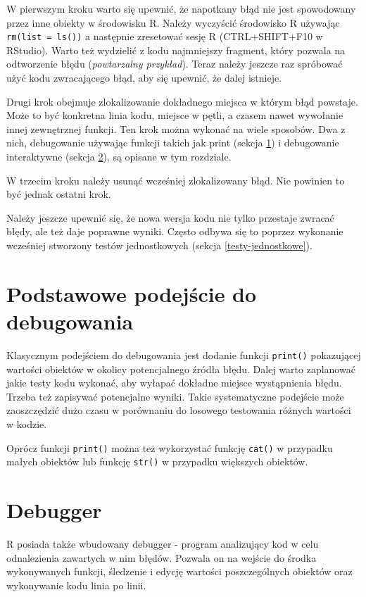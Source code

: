 \documentclass[paper=6in:9in,pagesize=pdftex,headinclude=on,footinclude=on,10pt]{scrbook}
\begin{document}
W pierwszym kroku warto się upewnić, że napotkany błąd nie jest spowodowany przez inne obiekty w środowisku R.
Należy wyczyścić środowisko R używając \texttt{rm(list\ =\ ls())} a następnie zresetować sesję R (CTRL+SHIFT+F10 w RStudio).
Warto też wydzielić z kodu najmniejszy fragment, który pozwala na odtworzenie błędu (\emph{powtarzalny przykład}).
Teraz należy jeszcze raz spróbować użyć kodu zwracającego błąd, aby się upewnić, że dalej istnieje.

Drugi krok obejmuje zlokalizowanie dokładnego miejsca w którym błąd powstaje.
Może to być konkretna linia kodu, miejsce w pętli, a czasem nawet wywołanie innej zewnętrznej funkcji.
Ten krok można wykonać na wiele sposobów.
Dwa z nich, debugowanie używając funkcji takich jak print (sekcja \ref{debuging-print}) i debugowanie interaktywne (sekcja \ref{debugger}), są opisane w tym rozdziale.

W trzecim kroku należy usunąć wcześniej zlokalizowany błąd.
Nie powinien to być jednak ostatni krok.

Należy jeszcze upewnić się, że nowa wersja kodu nie tylko przestaje zwracać błędy, ale też daje poprawne wyniki.
Często odbywa się to poprzez wykonanie wcześniej stworzony testów jednostkowych (sekcja \ref{testy-jednostkowe}).

\hypertarget{debuging-print}{%
\section{Podstawowe podejście do debugowania}\label{debuging-print}}

Klasycznym podejściem do debugowania jest dodanie funkcji \texttt{print()} pokazującej wartości obiektów w okolicy potencjalnego źródła błędu.
Dalej warto zaplanować jakie testy kodu wykonać, aby wyłapać dokładne miejsce wystąpnienia błędu.
Trzeba też zapisywać potencjalne wyniki.
Takie systematyczne podejście może zaoszczędzić dużo czasu w porównaniu do losowego testowania różnych wartości w kodzie.

Oprócz funkcji \texttt{print()} można też wykorzystać funkcję \texttt{cat()} w przypadku małych obiektów lub funkcję \texttt{str()} w przypadku większych obiektów.

\hypertarget{debugger}{%
\section{Debugger}\label{debugger}}

R posiada także wbudowany debugger - program analizujący kod w celu odnalezienia zawartych w nim błędów.
Pozwala on na wejście do środka wykonywanych funkcji, śledzenie i edycję wartości poszczególnych obiektów oraz wykonywanie kodu linia po linii.
\end{document}
